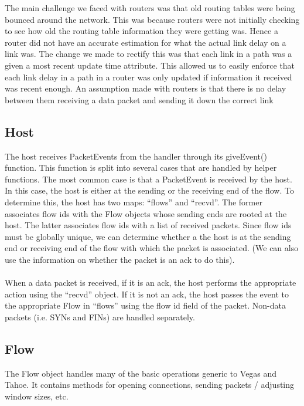 \documentclass[12pt]{article}
\begin{document}
The main challenge we faced with routers was that old routing tables were being bounced around the network. This was because routers were not initially checking to see how old the routing table information they were getting was. Hence a router did not have an accurate estimation for what the actual link delay on a link was. The change we made to rectify this was that each link in a path was a given a most recent update time attribute. This allowed us to easily enforce that each link delay in a path in a router was only updated if information it received was recent enough. An assumption made with routers is that there is no delay between them receiving a data packet and sending it down the correct link


\subsection{Host}
The host receives PacketEvents from the handler through its giveEvent() function.  This function is split into several cases that are handled by helper functions.  The most common case is that a PacketEvent is received by the host.  In this case, the host is either at the sending or the receiving end of the flow.  To determine this, the host has two maps: ``flows'' and ``recvd''.  The former associates flow ids with the Flow objects whose sending ends are rooted at the host.  The latter associates flow ids with a list of received packets.  Since flow ids must be globally unique, we can determine whether a the host is at the sending end or receiving end of the flow with which the packet is associated.  (We can also use the information on whether the packet is an ack to do this).
\\\\
When a data packet is received, if it is an ack, the host performs the appropriate action using the ``recvd'' object.  If it is not an ack, the host passes the event to the appropriate Flow in ``flows'' using the flow id field of the packet.  Non-data packets (i.e. SYNs and FINs) are handled separately.

\subsection{Flow}
The Flow object handles many of the basic operations generic to Vegas and Tahoe.  It contains methods for opening connections, sending packets / adjusting window sizes, etc.
\end{document}
